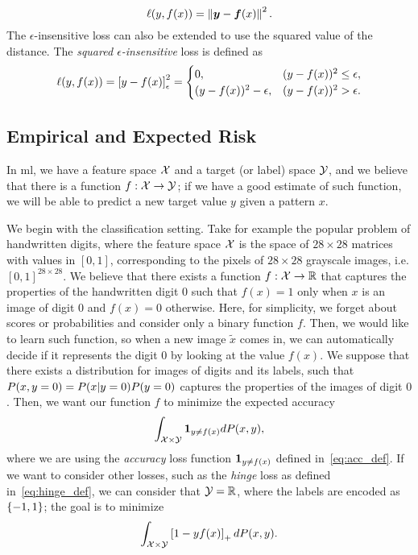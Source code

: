 \begin{equation}
    \label{eq:sqmulti_def}
    \lossf(y, f(x)) =  \norm{\fv{y} - \fv{f}(x)}^2.
\end{equation}
%
The $\epsilon$-insensitive loss can also be extended to use the squared value of the distance. The \emph{squared $\epsilon$-insensitive} loss is defined as
\begin{equation}
    \label{eq:sqepsins_def}
    \lossf(y, f(x)) = \epsins{y - f(x)}^2 =
    \begin{cases}
        0, & (y - f(x))^2 \leq \epsilon ,\\
        (y - f(x))^2 - \epsilon, & (y - f(x))^2 > \epsilon .\\
    \end{cases}
\end{equation} 

\subsection{Empirical and Expected Risk} 
In \acrshort{ml}, we have a feature space $\mathcal{X}$ and a target (or label) space $\mathcal{Y}$, and we believe that there is a function $f: \mathcal{X} \to \mathcal{Y}$; if we have a good estimate of such function, we will be able to predict a new target value $y$ given a pattern $x$. 

%
We begin with the classification setting. Take for example the popular problem  of handwritten digits, where the feature space $\mathcal{X}$ is the space of $28 \times 28$ matrices with values in $[0, 1]$, corresponding to the pixels of $28 \times 28$ grayscale images, i.e. $[0, 1]^{28 \times 28}$. We believe that there exists a function $f: \mathcal{X} \to \mathbb{R}$ that captures the properties of the handwritten digit $0$ such that $f(x)=1$ only when $x$ is an image of digit $0$ and $f(x)=0$ otherwise. 
Here, for simplicity, we forget about scores or probabilities and consider only a binary function $f$.
Then, we would like to learn such function, so when a new image $\tilde{x}$ comes in, we can automatically decide if it represents the digit $0$ by looking at the value $f(x)$.
%
We suppose that there exists a distribution for images of digits and its labels, such that $P(x, y=0) = P(x \vert y = 0) P(y = 0)$ captures the properties of the images of digit $0$. Then, we want our function $f$ to minimize the expected accuracy
$$ \int_{\mathcal{X} \times \mathcal{Y}} \bm{1}_{y \neq f(x)} dP(x, y) ,$$
where we are using the \emph{accuracy} loss function $\bm{1}_{y \neq f(x)}$ defined in~\eqref{eq:acc_def}. 
%
If we want to consider other losses, such as the \emph{hinge} loss as defined in~\eqref{eq:hinge_def}, we can consider that $\mathcal{Y} = \mathbb{R}$, where the labels are encoded as $\left\{-1, 1\right\}$; the goal is to minimize 
$$ \int_{\mathcal{X} \times \mathcal{Y}} \left[1 - y f(x)\right]_{+} dP(x, y) .$$

